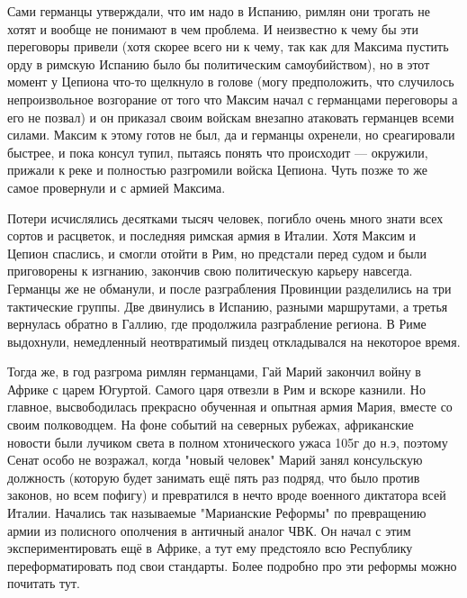 Сами германцы утверждали, что им надо в Испанию, римлян они трогать не хотят и вообще не понимают в чем проблема. И неизвестно к чему бы эти переговоры привели (хотя скорее всего ни к чему, так как для Максима пустить орду в римскую Испанию было бы политическим самоубийством), но в этот момент у Цепиона что-то щелкнуло в голове (могу предположить, что случилось непроизвольное возгорание от того что Максим начал с германцами переговоры а его не позвал) и он приказал своим войскам внезапно атаковать германцев всеми силами. Максим к этому готов не был, да и германцы охренели, но среагировали быстрее, и пока консул тупил, пытаясь понять что происходит — окружили, прижали к реке и полностью разгромили войска Цепиона. Чуть позже то же самое провернули и с армией Максима.


Потери исчислялись десятками тысяч человек, погибло очень много знати всех сортов и расцветок, и последняя римская армия в Италии. Хотя Максим и Цепион спаслись, и смогли отойти в Рим, но предстали перед судом и были приговорены к изгнанию, закончив свою политическую карьеру навсегда. Германцы же не обманули, и после разграбления Провинции разделились на три тактические группы. Две двинулись в Испанию, разными маршрутами, а третья вернулась обратно в Галлию, где продолжила разграбление региона. В Риме выдохнули, немедленный неотвратимый пиздец откладывался на некоторое время.


Тогда же, в год разгрома римлян германцами, Гай Марий закончил войну в Африке с царем Югуртой. Самого царя отвезли в Рим и вскоре казнили. Но главное, высвободилась прекрасно обученная и опытная армия Мария, вместе со своим полководцем. На фоне событий на северных рубежах, африканские новости были лучиком света в полном хтонического ужаса 105г до н.э, поэтому Сенат особо не возражал, когда "новый человек" Марий занял консульскую должность (которую будет занимать ещё пять раз подряд, что было против законов, но всем пофигу) и превратился в нечто вроде военного диктатора всей Италии. Начались так называемые "Марианские Реформы" по превращению армии из полисного ополчения в античный аналог ЧВК. Он начал с этим экспериментировать ещё в Африке, а тут ему предстояло всю Республику переформатировать под свои стандарты. Более подробно про эти реформы можно почитать тут.



